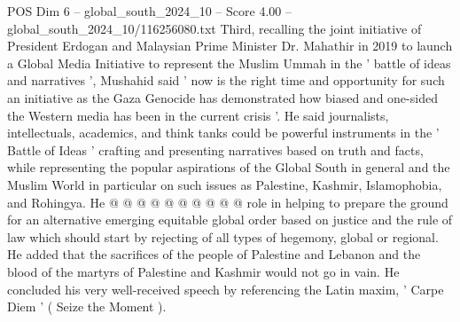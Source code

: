 \begin{textsample}{POS Dim 6 – global\_south\_2024\_10 – Score 4.00 – global\_south\_2024\_10/116256080.txt}
Third, recalling the joint initiative of President Erdogan and Malaysian Prime Minister Dr.
Mahathir in 2019 to launch a Global Media Initiative to represent the Muslim Ummah in the ' battle of ideas and narratives ', Mushahid said ' now is the right time and opportunity for such an initiative as the Gaza Genocide has demonstrated how biased and one-sided the Western media has been in the current crisis '.
He said journalists, intellectuals, academics, and think tanks could be powerful instruments in the ' Battle of Ideas ' crafting and presenting narratives based on truth and facts, while representing the popular aspirations of the Global South in general and the Muslim World in particular on such issues as Palestine, Kashmir, Islamophobia, and Rohingya.
He @ @ @ @ @ @ @ @ @ @ role in helping to prepare the ground for an alternative emerging equitable global order based on justice and the rule of law which should start by rejecting of all types of hegemony, global or regional.
He added that the sacrifices of the people of Palestine and Lebanon and the blood of the martyrs of Palestine and Kashmir would not go in vain.
He concluded his very well-received speech by referencing the Latin maxim, ' Carpe Diem ' ( Seize the Moment ).

\end{textsample}

